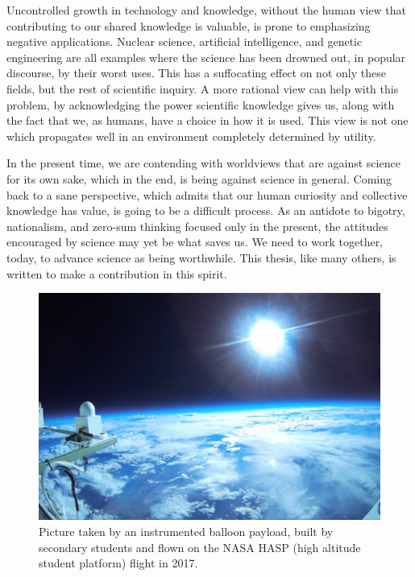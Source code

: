 Uncontrolled growth in technology and knowledge, without the human view that contributing to our shared knowledge is valuable, is prone to emphasizing negative applications. Nuclear science, artificial intelligence, and genetic engineering are all examples where the science has been drowned out, in popular discourse, by their worst uses. This has a suffocating effect on not only these fields, but the rest of scientific inquiry. A more rational view can help with this problem, by acknowledging the power scientific knowledge gives us, along with the fact that we, as humans, have a choice in how it is used. This view is not one which propagates well in an environment completely determined by utility. 

In the present time, we are contending with worldviews that are against science for its own sake, which in the end, is being against science in general. Coming back to a sane perspective, which admits that our human curiosity and collective knowledge has value, is going to be a difficult process. As an antidote to bigotry, nationalism, and zero-sum thinking focused only in the present, the attitudes encouraged by science may yet be what saves us. We need to work together, today, to advance science as being worthwhile. This thesis, like many others, is written to make a contribution in this spirit. 


\begin{figure}[p]
\label{keep_looking_up}
\includegraphics[width=\textwidth]{figures/chapter_1/keep_looking_up/keep_looking_up}
\caption{Picture taken by an instrumented balloon payload, built by secondary students and flown on the NASA HASP (high altitude student platform) flight in 2017. }
\end{figure}

